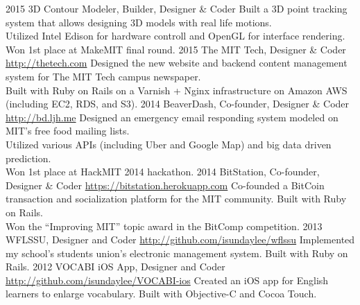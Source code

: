 \documentclass[]{friggeri-cv} %
\begin{document}
\begin{entrylist}
  \entry
  {2015}
  {3D Contour Modeler, Builder, Designer \& Coder}
  {}
  {Built a 3D point tracking system that allows designing 3D models with real life motions. \\
  Utilized Intel Edison for hardware controll and OpenGL for interface rendering. \\
  Won 1st place at MakeMIT final round. }
  \entry
  {2015}
  {The MIT Tech, Designer \& Coder}
  {\href{http://thetech.com}{http://thetech.com}}
  {Designed the new website and backend content management system for The MIT Tech campus newspaper. \\
  Built with Ruby on Rails on a Varnish + Nginx infrastructure on Amazon AWS (including EC2, RDS, and S3). }
  \entry
  {2014}
  {BeaverDash, Co-founder, Designer \& Coder}
  {\href{http://bd.ljh.me}{http://bd.ljh.me}}
  {Designed an emergency email responding system modeled on MIT's free food mailing lists. \\
  Utilized various APIs (including Uber and Google Map) and big data driven prediction. \\
  Won 1st place at HackMIT 2014 hackathon. }
  \entry
  {2014}
  {BitStation, Co-founder, Designer \& Coder}
  {\href{https://bitstation.herokuapp.com}{https://bitstation.herokuapp.com}}
  {Co-founded a BitCoin transaction and socialization platform for the MIT community. Built with Ruby on Rails. \\
  Won the ``Improving MIT'' topic award in the BitComp competition. }
  \entry
  {2013}
  {WFLSSU, Designer and Coder}
  {\href{http://github.com/isundaylee/wflssu}{http://github.com/isundaylee/wflssu}}
  {Implemented my school's students union's electronic management system. Built with Ruby on Rails.}
  \entry
  {2012}
  {VOCABI iOS App, Designer and Coder}
  {\href{http://github.com/isundaylee/VOCABI-ios}{http://github.com/isundaylee/VOCABI-ios}}
  {Created an iOS app for English learners to enlarge vocabulary. Built with Objective-C and Cocoa Touch.}
\end{entrylist}
\end{document}
